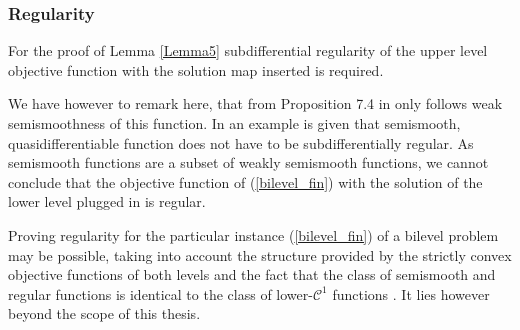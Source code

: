 \subsubsection{Regularity}

For the proof of Lemma \ref{Lemma5} subdifferential regularity of the upper level objective function with the solution map inserted is required.

We have however to remark here, that from Proposition 7.4 in \cite{Outrata1998} only follows weak semismoothness of this function.
In \cite[p. 82]{Spingarn1981} an example is given that semismooth, quasidifferentiable function does not have to be subdifferentially regular. As semismooth functions are a subset of weakly semismooth functions, we cannot conclude that the objective function of (\ref{bilevel_fin}) with the solution of the lower level plugged in is regular.

Proving regularity for the particular instance (\ref{bilevel_fin}) of a bilevel problem may be possible, taking into account the structure provided by the strictly convex objective functions of both levels and the fact that the class of semismooth and regular functions is identical to the class of lower-\(\mathcal{C}^1\) functions \cite[equation (3), p. 5]{Hare2016}. It lies however beyond the scope of this thesis.





